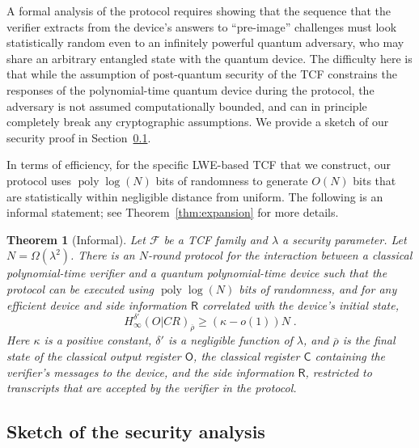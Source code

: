 \documentclass[11pt]{article}
\newtheorem{theorem}{Theorem}
\theoremstyle{remark}
\theoremstyle{definition}
\newcommand{\reg}[1]{{\textsf{#1}}}
\newcommand{\ol}[1]{\overline{#1}}
\DeclareMathOperator{\poly}{poly}
\newcommand{\Hmin}{H_\infty}
\begin{document}
A formal analysis of the protocol requires showing that the sequence
that the verifier extracts from the device's answers to ``pre-image'' challenges must look statistically random even to an 
infinitely powerful quantum adversary, who may share an arbitrary entangled state with
the quantum device. The difficulty here is that while the assumption of post-quantum security of the TCF constrains the responses of the polynomial-time quantum device during the
protocol, the adversary is not assumed computationally bounded, and can in principle completely break any cryptographic assumptions. We provide a sketch of our security proof in Section~\ref{sec:proofsketch}. 


In terms of efficiency, 
for the specific LWE-based TCF that we construct, our protocol uses $\poly\log(N)$ bits of randomness to 
generate $O(N)$ bits that are statistically within negligible distance from uniform. The following is an informal statement; see Theorem~\ref{thm:expansion} for more details. 


\begin{theorem}[Informal]
Let $\mathcal{F}$ be a TCF family and $\lambda$ a security parameter. Let $N = \Omega(\lambda^2)$. There is an $N$-round protocol for the interaction between a classical polynomial-time verifier and a quantum polynomial-time device such that the protocol can be executed using $\poly\log(N)$ bits of randomness, and for any efficient device and side information $\reg{R}$ correlated with the device's initial state,
$$\Hmin^{\delta'}(O|CR)_{\ol{\rho}} \geq  (\kappa-o(1)) N\;.$$
Here $\kappa$ is a positive constant, $\delta'$ is a negligible function of $\lambda$, and $\ol{\rho}$ is the final state of the classical output register $\reg{O}$, the classical register $\reg{C}$ containing the verifier's messages to the device, and the side information $\reg{R}$, restricted to transcripts that are accepted by the verifier in the protocol.
\end{theorem}



\subsection{Sketch of the security analysis}
\label{sec:proofsketch}
\end{document}
